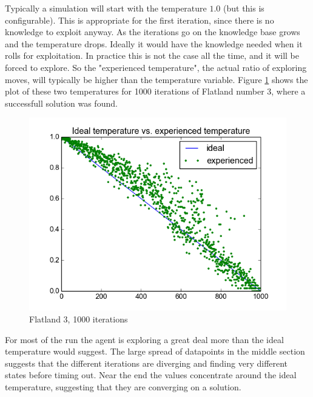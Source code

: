 Typically a simulation will start with the temperature $1.0$ (but this is configurable).
This is appropriate for the first iteration, since there is no knowledge to exploit anyway.
As the iterations go on the knowledge base grows and the temperature drops.
Ideally it would have the knowledge needed when it rolls for exploitation.
In practice this is not the case all the time, and it will be forced to explore.
So the "experienced temperature",
the actual ratio of exploring moves,
will typically be higher than the temperature variable.
Figure \ref{temp} shows the plot of these two temperatures for 1000 iterations of Flatland number 3,
where a successfull solution was found.

\begin{figure}[t]
    \centering
    \includegraphics[width=\linewidth]{img/temperature.png}
    \caption{Flatland 3, 1000 iterations}
    \label{temp}
\end{figure}

For most of the run the agent is exploring a great deal more than the ideal temperature would suggest.
The large spread of datapoints in the middle section suggests that the different iterations are diverging
and finding very different states before timing out.
Near the end the values concentrate around the ideal temperature,
suggesting that they are converging on a solution.

